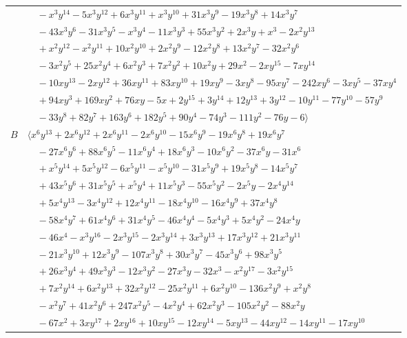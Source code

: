 \documentclass[11pt]{article}
\begin{document}
\begin{longtable}{@{}ll@{}}
 & $\quad -x^{3}y^{14}-5x^{3}y^{12}+6x^{3}y^{11}+x^{3}y^{10}+31x^{3}y^{9}-19x^{3}y^{8}+14x^{3}y^{7}$\\
 & $\quad -43x^{3}y^{6}-31x^{3}y^{5}-x^{3}y^{4}-11x^{3}y^{3}+55x^{3}y^{2}+2x^{3}y+x^{3}-2x^{2}y^{13}$\\
 & $\quad +x^{2}y^{12}-x^{2}y^{11}+10x^{2}y^{10}+2x^{2}y^{9}-12x^{2}y^{8}+13x^{2}y^{7}-32x^{2}y^{6}$\\
 & $\quad -3x^{2}y^{5}+25x^{2}y^{4}+6x^{2}y^{3}+7x^{2}y^{2}+10x^{2}y+29x^{2}-2xy^{15}-7xy^{14}$\\
 & $\quad -10xy^{13}-2xy^{12}+36xy^{11}+83xy^{10}+19xy^{9}-3xy^{8}-95xy^{7}-242xy^{6}-3xy^{5}-37xy^{4}$\\
 & $\quad +94xy^{3}+169xy^{2}+76xy-5x+2y^{15}+3y^{14}+12y^{13}+3y^{12}-10y^{11}-77y^{10}-57y^{9}$\\
 & $\quad -33y^{8}+82y^{7}+163y^{6}+182y^{5}+90y^{4}-74y^{3}-111y^{2}-76y-6\rangle$\\
$B$ & $\langle x^{6}y^{13}+2x^{6}y^{12}+2x^{6}y^{11}-2x^{6}y^{10}-15x^{6}y^{9}-19x^{6}y^{8}+19x^{6}y^{7}$\\
 & $\quad -27x^{6}y^{6}+88x^{6}y^{5}-11x^{6}y^{4}+18x^{6}y^{3}-10x^{6}y^{2}-37x^{6}y-31x^{6}$\\
 & $\quad +x^{5}y^{14}+5x^{5}y^{12}-6x^{5}y^{11}-x^{5}y^{10}-31x^{5}y^{9}+19x^{5}y^{8}-14x^{5}y^{7}$\\
 & $\quad +43x^{5}y^{6}+31x^{5}y^{5}+x^{5}y^{4}+11x^{5}y^{3}-55x^{5}y^{2}-2x^{5}y-2x^{4}y^{14}$\\
 & $\quad +5x^{4}y^{13}-3x^{4}y^{12}+12x^{4}y^{11}-18x^{4}y^{10}-16x^{4}y^{9}+37x^{4}y^{8}$\\
 & $\quad -58x^{4}y^{7}+61x^{4}y^{6}+31x^{4}y^{5}-46x^{4}y^{4}-5x^{4}y^{3}+5x^{4}y^{2}-24x^{4}y$\\
 & $\quad -46x^{4}-x^{3}y^{16}-2x^{3}y^{15}-2x^{3}y^{14}+3x^{3}y^{13}+17x^{3}y^{12}+21x^{3}y^{11}$\\
 & $\quad -21x^{3}y^{10}+12x^{3}y^{9}-107x^{3}y^{8}+30x^{3}y^{7}-45x^{3}y^{6}+98x^{3}y^{5}$\\
 & $\quad +26x^{3}y^{4}+49x^{3}y^{3}-12x^{3}y^{2}-27x^{3}y-32x^{3}-x^{2}y^{17}-3x^{2}y^{15}$\\
 & $\quad +7x^{2}y^{14}+6x^{2}y^{13}+32x^{2}y^{12}-25x^{2}y^{11}+6x^{2}y^{10}-136x^{2}y^{9}+x^{2}y^{8}$\\
 & $\quad -x^{2}y^{7}+41x^{2}y^{6}+247x^{2}y^{5}-4x^{2}y^{4}+62x^{2}y^{3}-105x^{2}y^{2}-88x^{2}y$\\
 & $\quad -67x^{2}+3xy^{17}+2xy^{16}+10xy^{15}-12xy^{14}-5xy^{13}-44xy^{12}-14xy^{11}-17xy^{10}$\\

\end{longtable}
\end{document}
